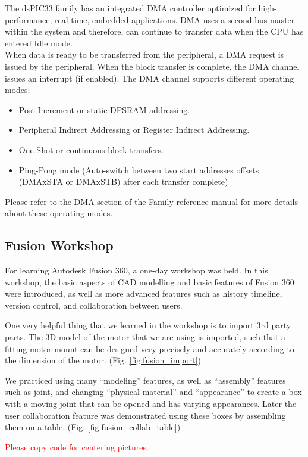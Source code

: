\vskip 0.2in
\noindent
The dsPIC33 family has an integrated DMA controller optimized for high-performance, real-time, embedded applications. DMA uses a second bus master within the system and therefore, can continue to transfer data when the CPU has entered Idle mode.\\
When data is ready to be transferred from the peripheral, a DMA request is issued by the peripheral. When the block transfer is complete, the DMA channel issues an interrupt (if enabled).
\vskip 0.2in
\noindent
The DMA channel supports different operating modes:
\begin{itemize}
    \item Post-Increment or static DPSRAM addressing.
    \item Peripheral Indirect Addressing or Register Indirect Addressing.
    \item One-Shot or continuous block transfers.
    \item Ping-Pong mode (Auto-switch between two start addresses offsets (DMAxSTA or DMAxSTB) after each transfer complete)
\end{itemize}

Please refer to the DMA section of the Family reference manual \cite{dma} for more details about these operating modes.


\subsection{Fusion Workshop}
For learning Autodesk Fusion 360, a one-day workshop was held. In this workshop, the basic aspects of CAD modelling and basic features of Fusion 360 were introduced, as well as more advanced features such as history timeline, version control, and collaboration between users.

One very helpful thing that we learned in the workshop is to import 3rd party parts. The 3D model of the motor that we are using is imported, such that a fitting motor mount can be designed very precisely and accurately according to the dimension of the motor. (Fig. \ref{fig:fusion_import})

We practiced using many “modeling” features, as well as “assembly” features such as joint, and changing “physical material” and “appearance” to create a box with a moving joint that can be opened and has varying appearances. Later the user collaboration feature was demonstrated using these boxes by assembling them on a table. (Fig. \ref{fig:fusion_collab_table})

\textcolor{red}{Please copy code for centering pictures.}

